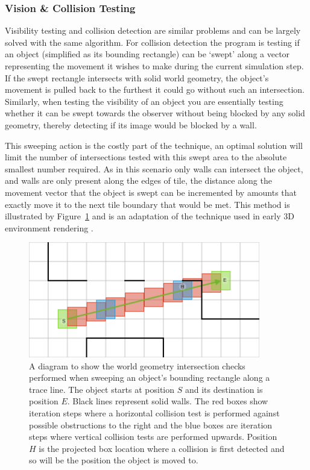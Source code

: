 \documentclass[12pt,a4paper]{article}
\begin{document}
\subsubsection{Vision \& Collision Testing}\noindent
Visibility testing and collision detection are similar problems and can be largely solved with the same algorithm. For collision detection the program is testing if an object (simplified as its bounding rectangle)
can be `swept' along a vector representing the movement it wishes to make during the current simulation step. If the swept rectangle intersects with solid world geometry, the object's movement is pulled back to the furthest it could go without such an intersection. Similarly, when testing the visibility of an object you are essentially testing whether it can be swept towards the observer without being blocked by any solid geometry, thereby detecting if its image would be blocked by a wall.

This sweeping action is the costly part of the technique, an optimal solution will limit the number of intersections tested with this swept area to the absolute smallest number required. As in this scenario only walls can intersect the object, and walls are only present along the edges of tile, the distance along the movement vector that the object is swept can be incremented by amounts that exactly move it to the next tile boundary that would be met. This method is illustrated by Figure~\ref{fig:trace} and is an adaptation of the technique used in early 3D environment rendering \cite{raycast}.

\begin{figure}[h]
\centering
\includegraphics[width=0.9\textwidth]{trace}
\caption{A diagram to show the world geometry intersection checks performed when sweeping an object's bounding rectangle along a trace line. The object starts at position $S$ and its destination is position $E$. Black lines represent solid walls. The red boxes show iteration steps where a horizontal collision test is performed against possible obstructions to the right and the blue boxes are iteration steps where vertical collision tests are performed upwards. Position $H$ is the projected box location where a collision is first detected and so will be the position the object is moved to.}
\label{fig:trace}
\end{figure}
\end{document}
